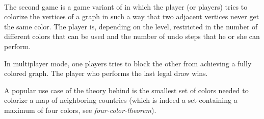 \paragraph*{\graphcoloring}
The second game is a game variant of {\graphcoloring} in which the player (or players) tries to colorize the vertices of a graph in such a way that two \gls{adjacent} vertices never get the same color. The player is, depending on the level, restricted in the number of different colors that can be used and the number of \gls{undo} steps that he or she can perform.\par
In multiplayer mode, one players tries to block the other from achieving a fully colored graph. The player who performs the last legal draw wins.\par
A popular use case of the theory behind {\graphcoloring} is the smallest set of colors needed to colorize a map of neighboring countries (which is indeed a set containing a maximum of four colors, see \emph{\gls{four-color-theorem}}).\par